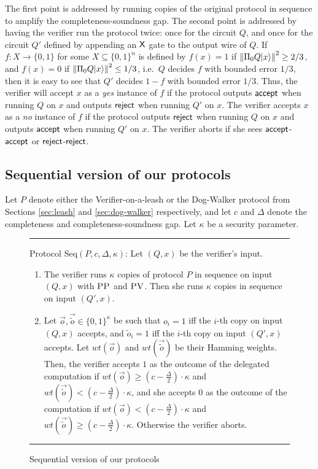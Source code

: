 The first point is addressed by running copies of the original protocol in sequence to amplify the completeness-soundness gap. The second point is addressed by having the verifier run the protocol twice: once for the circuit $Q$, and once for the circuit $Q'$ defined by appending an $\sf X$ gate to the output wire of $Q$. If $f:X\rightarrow \{0,1\}$ for some $X\subseteq \{0,1\}^n$ is defined by $f(x)=1$ if $\left\|\Pi_0 Q|x\rangle\right\|^2\geq 2/3$, and $f(x)=0$ if $\left\|\Pi_0 Q|x\rangle\right\|^2\leq 1/3$, i.e.\ $Q$ decides $f$ with bounded error $1/3$, then it is easy to see that $Q'$ decides $1-f$ with bounded error $1/3$. Thus, the verifier will accept $x$ as a \textit{yes} instance of $f$ if the protocol outputs ${\sf accept}$ when running $Q$ on $x$ and outputs $\sf reject$ when running $Q'$ on $x$. The verifier accepts $x$ as a \textit{no} instance of $f$ if the protocol outputs $\sf reject$ when running $Q$ on $x$ and outputs $\sf accept$ when running $Q'$ on $x$. The verifier aborts if she sees $\sf accept$-$\sf accept$ or $\sf reject$-$\sf reject$. 



\subsection{Sequential version of our protocols}


Let $P$ denote either the Verifier-on-a-leash or the Dog-Walker protocol from Sections \ref{sec:leash} and \ref{sec:dog-walker} respectively, and let $c$ and $\Delta$ denote the completeness and completeness-soundness gap. Let $\kappa$ be a security parameter.

\begin{figure}[H]
\rule[1ex]{16.5cm}{0.5pt}
\justify
Protocol $\mbox{Seq}(P,c,\Delta, \kappa)$: Let $(Q,x)$ be the verifier's input. 
\begin{enumerate}
\item The verifier runs $\kappa$ copies of protocol $P$ in sequence on input $(Q,x)$ with $\textsc{PP}$ and $\textsc{PV}$. Then she runs $\kappa$ copies in sequence on input $(Q',x)$. 
\item Let $\vec{o}, \vec{\tilde{o}} \in \{0,1\}^{\kappa}$ be such that $o_i = 1$ iff the $i$-th copy on input $(Q,x)$ accepts, and $\tilde{o}_i = 1$ iff the $i$-th copy on input $(Q',x)$ accepts. Let $wt(\vec{o})$ and $wt(\vec{\tilde{o}})$ be their Hamming weights. Then, the verifier accepts $1$ as the outcome of the delegated computation if $wt(\vec{o}) \geq (c- \frac{\Delta}{2}) \cdot \kappa$ and $wt(\vec{\tilde{o}}) < (c- \frac{\Delta}{2}) \cdot \kappa$, and she accepts $0$ as the outcome of the computation if $wt(\vec{o}) < (c- \frac{\Delta}{2})\cdot \kappa$ and $wt(\vec{\tilde{o}}) \geq (c- \frac{\Delta}{2}) \cdot \kappa$. Otherwise the verifier aborts.

\end{enumerate}
\rule[2ex]{16.5cm}{0.5pt}\vspace{-.5cm}
\caption{Sequential version of our protocols} \label{fig: gardenhose-protocol-parallel}
\end{figure}

